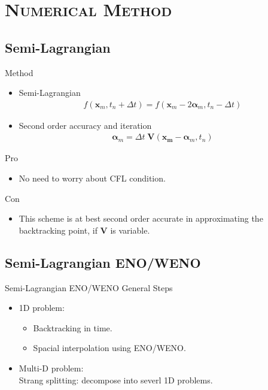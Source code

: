 \documentclass[xcolor=x11names,compress]{beamer}
\renewcommand{\(}{\begin{columns}}
\renewcommand{\)}{\end{columns}}
\newcommand{\<}[1]{\begin{column}{#1}}
\renewcommand{\>}{\end{column}}
\begin{document}
\section{\scshape Numerical Method}
\subsection{Semi-Lagrangian}
\begin{frame}
Method
\begin{itemize}
\item Semi-Lagrangian
\begin{eqnarray}
f(\mathbf{x}_m,t_n+\Delta t)=f(\mathbf{x}_m-2\mathbf{\alpha}_m,t_n-\Delta t)
\end{eqnarray}
\item Second order accuracy and iteration
\begin{eqnarray}
\mathbf{\alpha}_m=\Delta t\;\mathbf{V}(\mathbf{x_m}-\mathbf{\alpha}_m,t_n)
\end{eqnarray}
\end{itemize}
Pro
\begin{itemize}
\item No need to worry about CFL condition.
\end{itemize}
Con
\begin{itemize}
\item This scheme is at best second order accurate in approximating the backtracking point, if $\mathbf{V}$ is variable.
\end{itemize}
\end{frame}

\subsection{Semi-Lagrangian ENO/WENO}
\begin{frame}{Semi-Lagrangian ENO/WENO}
General Steps
\begin{itemize}
\item 1D problem:
\begin{itemize}
\item Backtracking in time.
\item Spacial interpolation using ENO/WENO.
\end{itemize}
\item Multi-D problem:\\
Strang splitting: decompose into severl 1D problems.
\end{itemize}
\end{frame}
\end{document}
